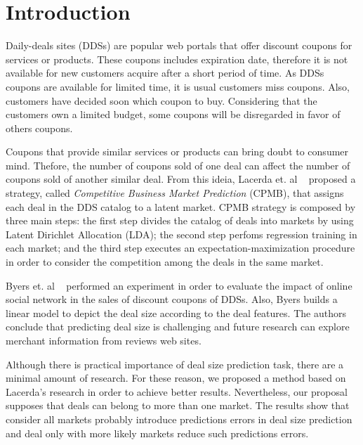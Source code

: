 \documentclass{acm_proc_article-sp}
\begin{document}


\section{Introduction}

Daily-deals sites (DDSs) are popular web portals that offer discount coupons 
for services or products. These coupons includes expiration date, therefore 
it is not available for new customers acquire after a short period of time. 
As DDSs coupons are available for limited time, it is usual customers 
miss coupons. Also, customers have decided soon which coupon to buy. 
Considering that the customers own a limited budget, some coupons 
will be disregarded in favor of others coupons.

Coupons that provide similar services or products can bring doubt to 
consumer mind. Thefore, the number of coupons sold of one deal  
can affect the number of coupons sold of another similar deal. From this ideia, 
Lacerda et. al ~\cite{lacerda2014context} proposed a 
strategy, called \emph{Competitive Business Market Prediction} 
(CPMB),
that assigns each deal in the DDS catalog to a latent 
market. CPMB strategy is composed by three main steps:
the first step divides the catalog of deals into markets 
by using Latent Dirichlet Allocation (LDA); the second step perfoms 
regression training in each market; and the third step executes an 
expectation-maximization  procedure in order to consider the 
competition among the deals in the same market.

Byers et. al ~\cite{BMZ12} performed an experiment in order to evaluate 
the impact of online social network in the sales of discount coupons 
of DDSs. Also, Byers builds a linear model to depict the deal size 
according to the deal features. The authors conclude that predicting 
deal size is challenging and future research can explore merchant information 
from reviews web sites.

Although there is practical importance of deal size prediction task, 
there are a minimal amount of research. For these reason, we proposed 
a method based on Lacerda's research in order to achieve better results. 
Nevertheless, our proposal supposes that deals can belong to more than 
one market. The results show that consider all markets probably introduce 
predictions errors in deal size prediction and 
deal only with more likely markets reduce such predictions errors.
\end{document}
